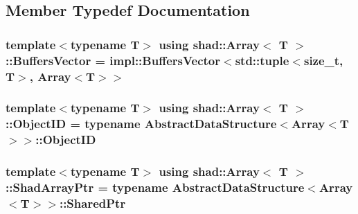 \subsection{Member Typedef Documentation}
\hypertarget{classshad_1_1Array_a9d0f8fb34a90f8b9d232aa086ff75d2a}{
\subsubsection[{Buffers\-Vector}]{\setlength{\rightskip}{0pt plus 5cm}template$<$typename T$>$ using {\bf shad\-::\-Array}$<$ T $>$\-::{\bf Buffers\-Vector} =  impl\-::\-Buffers\-Vector$<$std\-::tuple$<$size\-\_\-t, T$>$, {\bf Array}$<$T$>$$>$}}\label{classshad_1_1Array_a9d0f8fb34a90f8b9d232aa086ff75d2a}
\hypertarget{classshad_1_1Array_a69c0b0424c09d4779081e358548a3165}{
\subsubsection[{Object\-I\-D}]{\setlength{\rightskip}{0pt plus 5cm}template$<$typename T$>$ using {\bf shad\-::\-Array}$<$ T $>$\-::{\bf Object\-I\-D} =  typename {\bf Abstract\-Data\-Structure}$<${\bf Array}$<$T$>$$>$\-::{\bf Object\-I\-D}}}\label{classshad_1_1Array_a69c0b0424c09d4779081e358548a3165}
\hypertarget{classshad_1_1Array_a5ff91c72815df47db60fc6ed44b01d46}{
\subsubsection[{Shad\-Array\-Ptr}]{\setlength{\rightskip}{0pt plus 5cm}template$<$typename T$>$ using {\bf shad\-::\-Array}$<$ T $>$\-::{\bf Shad\-Array\-Ptr} =  typename {\bf Abstract\-Data\-Structure}$<${\bf Array}$<$T$>$$>$\-::{\bf Shared\-Ptr}}}\label{classshad_1_1Array_a5ff91c72815df47db60fc6ed44b01d46}


